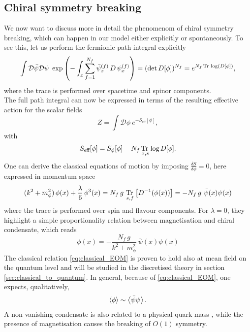 \subsection{Chiral symmetry breaking}
We now want to discuss more in detail the phenomenom of chiral symmetry breaking, which can happen in our model either explicitly or spontaneously. To see this, let us perform the fermionic path integral explicitly
\begin{equation*}
    \int \mathcal{D} \bar\psi \mathcal{D} \psi \ \exp\left( - \int_x \sum_{f=1}^{N_f} \bar\psi_x^{(f)} \,  D \, \psi_x^{(f)} \right) = (\text{det} \, D[\phi])^{N_f} = e^{N_f\operatorname{\text{Tr} \,} \log (D[\phi])},
\end{equation*}
where the trace is performed over spacetime and spinor components. \\ 
The full path integral can now be expressed in terms of the resulting effective action for the scalar fields
\begin{equation*}
    Z = \int \mathcal{D}\phi \ e^{-S_\text{eff}[\phi]},
\end{equation*}
with
\begin{equation}
    S_\text{eff}[\phi] = S_{\phi}[\phi] - N_f \, \underset{x,s}{\operatorname{\text{Tr} \,}} \log D[\phi].
    \label{eq:effective_action_no_fermions}
\end{equation}
One can derive the classical equations of motion by imposing $\frac{\delta S}{\delta \phi} = 0$, here expressed in momentum space
\begin{equation}
     (k^2 + m_\phi^2) \, \phi(x) + \frac{\lambda}{6} \, \phi^3(x) = N_f \, g \ \underset{s,f}{\tr} \left[D^{-1}(\phi(x))\right] = - N_f \, g \ \bar\psi(x) \psi(x)
     \label{eq:classical_EOM_full}
\end{equation}
where the trace is performed over spin and flavour components. For $\lambda = 0$, they highlight a simple proportionality relation between magnetisation and chiral condensate, which reads
\begin{equation}
    \phi(x) = - \frac{N_f \, g}{k^2 + m_\phi^2} \ \bar \psi(x) \psi(x)
    \label{eq:classical_EOM}
\end{equation}
The classical relation \eqref{eq:classical_EOM} is proven to hold also at mean field on the quantum level \cite{Ayala2021QCDDescriptions} and will be studied in the discretised theory in section \ref{sec:classical_to_quantum}. 
In general, because of \eqref{eq:classical_EOM}, one expects, qualitatively,
\begin{equation}
    \left\langle \phi \right\rangle \sim \left\langle \bar\psi\psi \right\rangle.
    \label{eq:qualitative_relation_condensate_magnetisation}
\end{equation}
A non-vanishing condensate is also related to a physical quark mass \cite{Ayala2021QCDDescriptions,MANOHAR1984189}, while the presence of magnetisation causes the breaking of $O(1)$ symmetry.\\~\\


